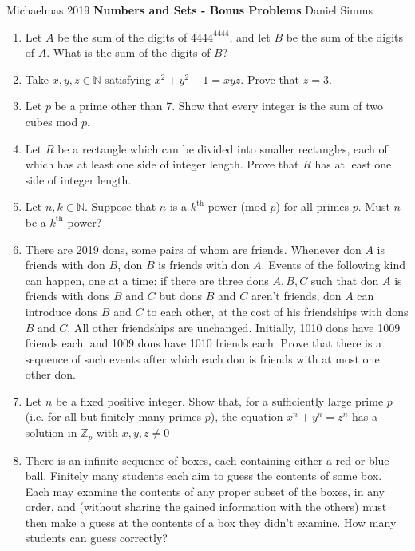 \documentclass[12pt,a4paper]{article}
\newcommand\Z{\mathbb{Z}}
\newcommand\N{\mathbb{N}}
\begin{document}
	\begingroup
	Michaelmas 2019
	\hspace*{\fill}
	\textbf{Numbers and Sets - Bonus Problems}
	\hspace*{\fill} Daniel Simms
	\endgroup
	
	\vspace{0.3cm}

	\begin{enumerate}
		\item Let $A$ be the sum of the digits of $4444^{4444}$, and let $B$ be the sum of the digits of $A$. What is the sum of the digits of $B$?
		\item Take $x,y,z \in \N$ satisfying $x^{2} + y^{2} + 1 = xyz$. Prove that $z=3$.
		\item Let $p$ be a prime other than 7. Show that every integer is the sum of two cubes mod $p$.
		\item Let $R$ be a rectangle which can be divided into smaller rectangles, each of which has at least one side of integer length. Prove that $R$ has at least one side of integer length.
		\item Let $n, k \in \N$. Suppose that $n$ is a $k^{\text{th}}$  power (mod $p$) for all primes $p$. Must $n$ be a $k^{\text{th}}$ power?
		\item There are 2019 dons, some pairs of whom are friends. Whenever don $A$ is friends with don $B$, don $B$ is friends with don $A$. Events of the following kind can happen, one at a time: if there are three dons $A,B,C$ such that don $A$ is friends with dons $B$ and $C$ but dons $B$ and $C$ aren't friends, don $A$ can introduce dons $B$ and $C$ to each other, at the cost of his friendships with dons $B$ and $C$. All other friendships are unchanged. Initially, 1010 dons have 1009 friends each, and 1009 dons have 1010 friends each. Prove that there is a sequence of such events after which each don is friends with at most one other don.
		\item Let $n$ be a fixed positive integer. Show that, for a sufficiently large prime $p$ (i.e. for all but finitely many primes $p$), the equation $x^{n} + y ^{n} = z^{n}$ has a solution in $\Z_{p}$ with $x,y,z \neq 0$
		\item There is an infinite sequence of boxes, each containing either a red or blue ball. Finitely many students each aim to guess the contents of some box. Each may examine the contents of any proper subset of the boxes, in any order, and (without sharing the gained information with the others) must then make a guess at the contents of a box they didn’t examine. How many students can guess correctly?

\end{enumerate}
\end{document}

